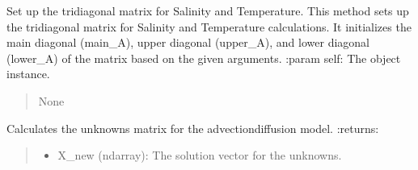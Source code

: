 \documentclass[a4paper,11pt,english,openany]{sphinxmanual}
\begin{document}
\begin{fulllineitems}

\begin{fulllineitems}
\label{\detokenize{api/spyice.models.advection_diffusion:src.spyice.models.advection_diffusion.AdvectionDiffusion.set_up_tridiagonal}}
\pysigstartsignatures
\pysiglinewithargsret
{}
{}
{}
\pysigstopsignatures
\sphinxAtStartPar
Set up the tridiagonal matrix for Salinity and Temperature.
This method sets up the tridiagonal matrix for Salinity and Temperature calculations. It initializes the main diagonal (main\_A), upper diagonal (upper\_A), and lower diagonal (lower\_A) of the matrix based on the given arguments.
:param self: The object instance.
\begin{quote}\begin{description}
\sphinxAtStartPar
None

\end{description}\end{quote}

\end{fulllineitems}


\begin{fulllineitems}
\label{\detokenize{api/spyice.models.advection_diffusion:src.spyice.models.advection_diffusion.AdvectionDiffusion.unknowns_matrix}}
\pysigstartsignatures
\pysiglinewithargsret
{}
{\sphinxparamcomma {}}
{}
\pysigstopsignatures
\sphinxAtStartPar
Calculates the unknowns matrix for the advection\sphinxhyphen{}diffusion model.
:returns:
\begin{quote}
\begin{description}
\begin{itemize}
\item {} 
\sphinxAtStartPar
X\_new (ndarray): The solution vector for the unknowns.


\end{itemize}
\end{description}
\end{quote}
\end{fulllineitems}
\end{fulllineitems}
\end{document}
